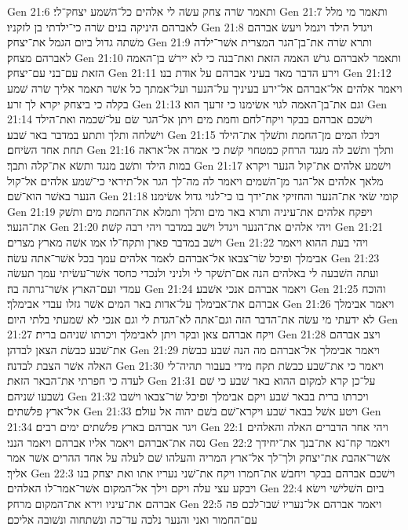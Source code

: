 Gen 21:6  ותאמר שׂרה צחק עשׂה לי אלהים כל־השׁמע יצחק־לי׃
Gen 21:7  ותאמר מי מלל לאברהם היניקה בנים שׂרה כי־ילדתי בן לזקניו׃
Gen 21:8  ויגדל הילד ויגמל ויעשׂ אברהם משׁתה גדול ביום הגמל את־יצחק׃
Gen 21:9  ותרא שׂרה את־בן־הגר המצרית אשׁר־ילדה לאברהם מצחק׃
Gen 21:10  ותאמר לאברהם גרשׁ האמה הזאת ואת־בנה כי לא יירשׁ בן־האמה הזאת עם־בני עם־יצחק׃
Gen 21:11  וירע הדבר מאד בעיני אברהם על אודת בנו׃
Gen 21:12  ויאמר אלהים אל־אברהם אל־ירע בעיניך על־הנער ועל־אמתך כל אשׁר תאמר אליך שׂרה שׁמע בקלה כי ביצחק יקרא לך זרע׃
Gen 21:13  וגם את־בן־האמה לגוי אשׂימנו כי זרעך הוא׃
Gen 21:14  וישׁכם אברהם בבקר ויקח־לחם וחמת מים ויתן אל־הגר שׂם על־שׁכמה ואת־הילד וישׁלחה ותלך ותתע במדבר באר שׁבע׃
Gen 21:15  ויכלו המים מן־החמת ותשׁלך את־הילד תחת אחד השׂיחם׃
Gen 21:16  ותלך ותשׁב לה מנגד הרחק כמטחוי קשׁת כי אמרה אל־אראה במות הילד ותשׁב מנגד ותשׂא את־קלה ותבך׃
Gen 21:17  וישׁמע אלהים את־קול הנער ויקרא מלאך אלהים אל־הגר מן־השׁמים ויאמר לה מה־לך הגר אל־תיראי כי־שׁמע אלהים אל־קול הנער באשׁר הוא־שׁם׃
Gen 21:18  קומי שׂאי את־הנער והחזיקי את־ידך בו כי־לגוי גדול אשׂימנו׃
Gen 21:19  ויפקח אלהים את־עיניה ותרא באר מים ותלך ותמלא את־החמת מים ותשׁק את־הנער׃
Gen 21:20  ויהי אלהים את־הנער ויגדל וישׁב במדבר ויהי רבה קשׁת׃
Gen 21:21  וישׁב במדבר פארן ותקח־לו אמו אשׁה מארץ מצרים׃
Gen 21:22  ויהי בעת ההוא ויאמר אבימלך ופיכל שׂר־צבאו אל־אברהם לאמר אלהים עמך בכל אשׁר־אתה עשׂה׃
Gen 21:23  ועתה השׁבעה לי באלהים הנה אם־תשׁקר לי ולניני ולנכדי כחסד אשׁר־עשׂיתי עמך תעשׂה עמדי ועם־הארץ אשׁר־גרתה בה׃
Gen 21:24  ויאמר אברהם אנכי אשׁבע׃
Gen 21:25  והוכח אברהם את־אבימלך על־אדות באר המים אשׁר גזלו עבדי אבימלך׃
Gen 21:26  ויאמר אבימלך לא ידעתי מי עשׂה את־הדבר הזה וגם־אתה לא־הגדת לי וגם אנכי לא שׁמעתי בלתי היום׃
Gen 21:27  ויקח אברהם צאן ובקר ויתן לאבימלך ויכרתו שׁניהם ברית׃
Gen 21:28  ויצב אברהם את־שׁבע כבשׂת הצאן לבדהן׃
Gen 21:29  ויאמר אבימלך אל־אברהם מה הנה שׁבע כבשׂת האלה אשׁר הצבת לבדנה׃
Gen 21:30  ויאמר כי את־שׁבע כבשׂת תקח מידי בעבור תהיה־לי לעדה כי חפרתי את־הבאר הזאת׃
Gen 21:31  על־כן קרא למקום ההוא באר שׁבע כי שׁם נשׁבעו שׁניהם׃
Gen 21:32  ויכרתו ברית בבאר שׁבע ויקם אבימלך ופיכל שׂר־צבאו וישׁבו אל־ארץ פלשׁתים׃
Gen 21:33  ויטע אשׁל בבאר שׁבע ויקרא־שׁם בשׁם יהוה אל עולם׃
Gen 21:34  ויגר אברהם בארץ פלשׁתים ימים רבים׃
Gen 22:1  ויהי אחר הדברים האלה והאלהים נסה את־אברהם ויאמר אליו אברהם ויאמר הנני׃
Gen 22:2  ויאמר קח־נא את־בנך את־יחידך אשׁר־אהבת את־יצחק ולך־לך אל־ארץ המריה והעלהו שׁם לעלה על אחד ההרים אשׁר אמר אליך׃
Gen 22:3  וישׁכם אברהם בבקר ויחבשׁ את־חמרו ויקח את־שׁני נעריו אתו ואת יצחק בנו ויבקע עצי עלה ויקם וילך אל־המקום אשׁר־אמר־לו האלהים׃
Gen 22:4  ביום השׁלישׁי וישׂא אברהם את־עיניו וירא את־המקום מרחק׃
Gen 22:5  ויאמר אברהם אל־נעריו שׁבו־לכם פה עם־החמור ואני והנער נלכה עד־כה ונשׁתחוה ונשׁובה אליכם׃
